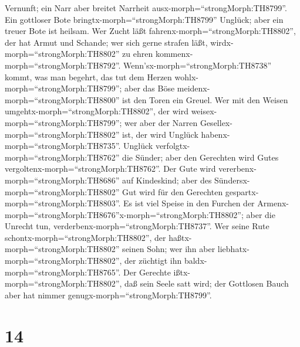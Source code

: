 Vernunft; ein Narr aber breitet Narrheit
ausx-morph=``strongMorph:TH8799''.  Ein gottloser Bote
bringtx-morph=``strongMorph:TH8799'' Unglück; aber ein treuer Bote ist
heilsam.  Wer Zucht läßt
fahrenx-morph=``strongMorph:TH8802'', der hat Armut und Schande; wer
sich gerne strafen läßt, wirdx-morph=``strongMorph:TH8802'' zu ehren
kommenx-morph=``strongMorph:TH8792''. 
Wenn'sx-morph=``strongMorph:TH8738'' kommt, was man begehrt, das tut dem
Herzen wohlx-morph=``strongMorph:TH8799''; aber das Böse
meidenx-morph=``strongMorph:TH8800'' ist den Toren ein Greuel.
 Wer mit den Weisen umgehtx-morph=``strongMorph:TH8802'',
der wird weisex-morph=``strongMorph:TH8799''; wer aber der Narren
Gesellex-morph=``strongMorph:TH8802'' ist, der wird Unglück
habenx-morph=``strongMorph:TH8735''.  Unglück
verfolgtx-morph=``strongMorph:TH8762'' die Sünder; aber den Gerechten
wird Gutes vergoltenx-morph=``strongMorph:TH8762''.  Der
Gute wird vererbenx-morph=``strongMorph:TH8686'' auf Kindeskind; aber
des Sündersx-morph=``strongMorph:TH8802'' Gut wird für den Gerechten
gespartx-morph=``strongMorph:TH8803''.  Es ist viel Speise
in den Furchen der
Armenx-morph=``strongMorph:TH8676''x-morph=``strongMorph:TH8802''; aber
die Unrecht tun, verderbenx-morph=``strongMorph:TH8737''. 
Wer seine Rute schontx-morph=``strongMorph:TH8802'', der
haßtx-morph=``strongMorph:TH8802'' seinen Sohn; wer ihn aber
liebhatx-morph=``strongMorph:TH8802'', der züchtigt ihn
baldx-morph=``strongMorph:TH8765''.  Der Gerechte
ißtx-morph=``strongMorph:TH8802'', daß sein Seele satt wird; der
Gottlosen Bauch aber hat nimmer genugx-morph=``strongMorph:TH8799''.

\hypertarget{section-13}{%
\section{14}\label{section-13}}

